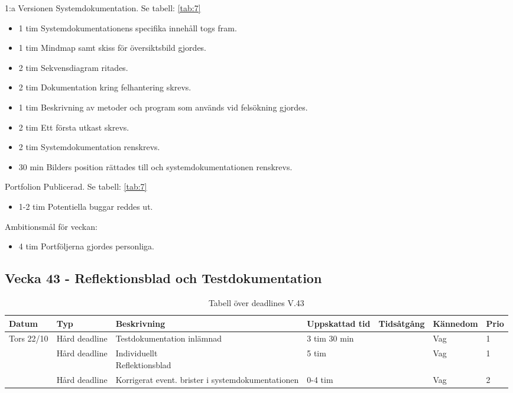 \documentclass{TDP003mall}
\begin{document}
1:a Versionen Systemdokumentation. Se tabell: \ref{tab:7}
\begin{itemize}
  \item 1 tim Systemdokumentationens specifika innehåll togs fram.
  \item 1 tim Mindmap samt skiss för översiktsbild gjordes.
  \item 2 tim Sekvensdiagram ritades.
  \item 2 tim Dokumentation kring felhantering skrevs.
  \item 1 tim Beskrivning av metoder och program som används vid felsökning gjordes.
  \item 2 tim Ett första utkast skrevs.
  \item 2 tim Systemdokumentation renskrevs.
  \item 30 min Bilders position rättades till och systemdokumentationen renskrevs.
\end{itemize}

Portfolion Publicerad. Se tabell: \ref{tab:7}
\begin{itemize}
\item 1-2 tim Potentiella buggar reddes ut.
  \end{itemize}

Ambitionsmål för veckan:
\begin{itemize}
\item 4 tim Portföljerna gjordes personliga.
\end{itemize}



\subsection*{Vecka 43 - Reflektionsblad och Testdokumentation}
\begin{table}[h!]
\caption{Tabell över deadlines V.43\label{tab:8}}  
\begin{tabularx}{\linewidth}{|l|l|X|l|l|l|l|}
  \hline
  Datum      & Typ           & Beskrivning                                       & Uppskattad tid & Tidsåtgång & Kännedom & Prio \\ [0.5ex]
  \hline                                                                             
  Tors 22/10 & Hård deadline & Testdokumentation inlämnad                        & 3 tim 30 min   &            & Vag      & 1\\
  \hline                                                                             
             & Hård deadline & \makecell[tl]{Individuellt \\ Reflektionsblad}    & 5 tim          &            & Vag      & 1\\
  \hline                                                                             
             & Hård deadline & Korrigerat event. brister i systemdokumentationen & 0-4 tim        &            & Vag      & 2\\
  \hline
\end{tabularx}      
      \end{table}
\end{document}
